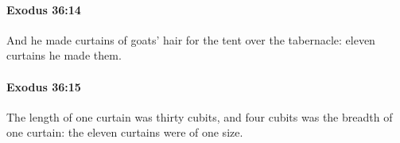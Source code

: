 		\paragraph{Exodus 36:14} %
			\label{EXODUS-36-14}

			And he made curtains of goats' hair for the tent over the tabernacle: eleven curtains he made them.


		\paragraph{Exodus 36:15} %
			\label{EXODUS-36-15}

			The length of one curtain was thirty cubits, and four cubits was the breadth of one curtain: the eleven curtains were of one size.


